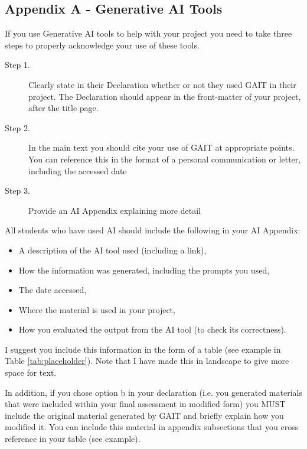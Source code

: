 \documentclass[11pt,a4paper]{article}
\begin{document}
\newpage
\begin{appendix}
\section{Appendix A - Generative AI Tools}
If you use Generative AI tools to help with your project you need to take three steps to properly acknowledge your use of these tools.
\begin{description}
   \item[Step 1.] Clearly state in their Declaration whether or not they used GAIT in their project. The Declaration should appear in the front-matter of your project, after the title page.
\item[Step 2.] In the main text you should cite your use of GAIT at appropriate points. You can reference this in the format of a personal communication or letter, including the accessed date
\item[Step 3.] Provide an AI Appendix explaining more detail
\end{description}

All students who have used AI should include the following in your AI Appendix:
\begin{itemize}
    \item A description of the AI tool used (including a link),
    \item How the information was generated, including the prompts you used, 
\item The date accessed,
\item Where the material is used in your project,
\item How you evaluated the output from the AI tool (to check its correctness).
\end{itemize}

I suggest you include this information in the form of a table (see example in Table \ref{tab:placeholder}). Note that I have made this in landscape to give more space for text. 

In addition, if you chose option b in your declaration (i.e. you generated materials that were included within your final assessment in modified form) you MUST include the original material generated by GAIT and briefly explain how you modified it. You can include this material in appendix subsections that you cross reference in your table (see example). 


\end{appendix}
\end{document}
